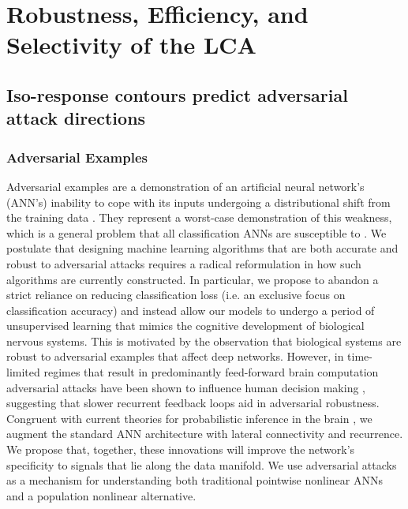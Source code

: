 \chapter{Robustness, Efficiency, and Selectivity of the LCA}

\section{Iso-response contours predict adversarial attack directions}\label{sec:ch4_adv_defense}
\subsection{Adversarial Examples}
Adversarial examples are a demonstration of an artificial neural network's (ANN’s) inability to cope with its inputs undergoing a distributional shift from the training data \parencite{ford2019adversarial}. They represent a worst-case demonstration of this weakness, which is a general problem that all classification ANNs are susceptible to \parencite{hendrycks2018benchmarking}. We postulate that designing machine learning algorithms that are both accurate and robust to adversarial attacks requires a radical reformulation in how such algorithms are currently constructed. In particular, we propose to abandon a strict reliance on reducing classification loss (i.e. an exclusive focus on classification accuracy) and instead allow our models to undergo a period of unsupervised learning that mimics the cognitive development of biological nervous systems. This is motivated by the observation that biological systems are robust to adversarial examples that affect deep networks. However, in time-limited regimes that result in predominantly feed-forward brain computation adversarial attacks have been shown to influence human decision making \parencite{elsayed2018adversarial}, suggesting that slower recurrent feedback loops aid in adversarial robustness. Congruent with current theories for probabilistic inference in the brain \parencite{lee2003hierarchical}, we augment the standard ANN architecture with lateral connectivity and recurrence. We propose that, together, these innovations will improve the network’s specificity to signals that lie along the data manifold. We use adversarial attacks as a mechanism for understanding both traditional pointwise nonlinear ANNs and a population nonlinear alternative.

